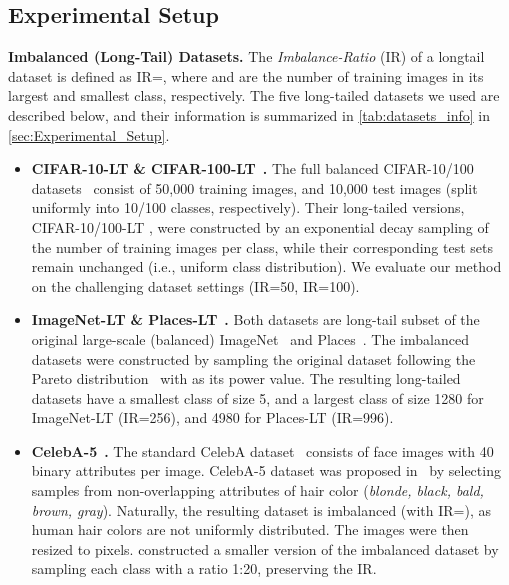 \documentclass[nohyperref]{article}
\theoremstyle{plain}
\theoremstyle{definition}
\theoremstyle{remark}
\begin{document}
\subsection{Experimental Setup}
\textbf{Imbalanced (Long-Tail) Datasets.}
The \emph{Imbalance-Ratio} (IR) of a longtail dataset is defined as IR=, where  and  are the number of training images in its largest and smallest class, respectively. 
The five long-tailed datasets we used are described below, and their information is summarized in \cref{tab:datasets_info} in \cref{sec:Experimental_Setup}.
\begin{itemize}[topsep=0pt,itemsep=-1ex,partopsep=1ex,parsep=1ex,leftmargin=*]
	\item \textbf{CIFAR-10-LT} \textbf{\& CIFAR-100-LT}~\cite{cao2019learning}\textbf{.} The full balanced CIFAR-10/100 datasets~\cite{krizhevsky2009learning} consist of 50,000 training images,
	and 10,000 test images (split uniformly into 10/100 classes, respectively). 
	Their long-tailed versions, CIFAR-10/100-LT 
	\cite{cao2019learning}, were constructed by an exponential decay sampling of the number of training images per class, while their corresponding test sets remain unchanged (i.e., uniform class distribution).  
	We evaluate our method on the  challenging dataset settings (IR=50, IR=100). 
	\item \textbf{ImageNet-LT} \textbf{\& Places-LT}~\cite{liu2019large}\textbf{.} Both datasets 
	are long-tail subset of the original large-scale (balanced)  ImageNet~\cite{deng2009imagenet} and Places~\cite{zhou2017places}. The imbalanced datasets were constructed by sampling the original dataset following the Pareto distribution~\cite{reed2001pareto} with  as its power value. The resulting long-tailed datasets have a smallest class of size 5, and a largest  class of size 1280 for ImageNet-LT (IR=256), and 4980 for Places-LT (IR=996).
	\item \textbf{CelebA-5}~\cite{kim2020m2m}\textbf{.} The standard CelebA dataset~\cite{liu2015faceattributes} consists of face images with 40 binary attributes per image. CelebA-5 dataset was proposed in~\cite{mullick2019generative} by selecting samples from non-overlapping attributes of hair color (\textit{blonde, black, bald, brown,  gray}). Naturally, the resulting dataset is imbalanced (with IR=), as human hair colors are not uniformly distributed. The images were then resized to  pixels. \citet{kim2020m2m} constructed a smaller version of the imbalanced dataset by sampling each class with a ratio 1:20, preserving the IR.
\end{itemize}
\end{document}
